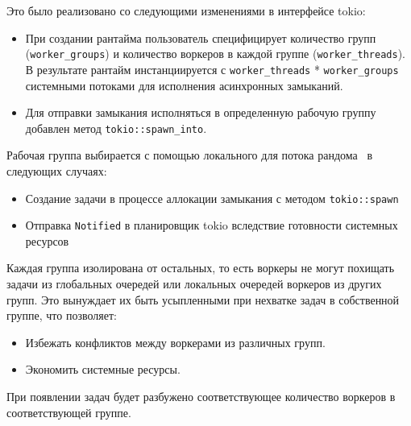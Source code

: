 Это было реализовано со следующими изменениями в интерфейсе tokio:

\begin{itemize}

\item При создании рантайма пользователь специфицирует количество групп (\verb|worker_groups|) и количество воркеров в каждой группе (\verb|worker_threads|). В результате рантайм инстанциируется с \verb|worker_threads| * \verb|worker_groups| системными потоками для исполнения асинхронных замыканий.
\item Для отправки замыкания исполняться в определенную рабочую группу добавлен метод \verb|tokio::spawn_into|.
\end{itemize}


Рабочая группа выбирается с помощью локального для потока рандома~\cite{xorshiftRNG} в следующих случаях:

\begin{itemize}
    \item Создание задачи в процессе аллокации замыкания с методом \verb|tokio::spawn|
    \item Отправка \verb|Notified| в планировщик tokio вследствие готовности системных ресурсов
\end{itemize}

Каждая группа изолирована от остальных, то есть воркеры не могут похищать задачи из глобальных очередей или локальных очередей воркеров из других групп. Это вынуждает их быть усыпленными при нехватке задач в собственной группе, что позволяет:

\begin{itemize}
    \item Избежать конфликтов между воркерами из различных групп.
    \item Экономить системные ресурсы.
\end{itemize}

При появлении задач будет разбужено соответствующее количество воркеров в соответствующей группе.
